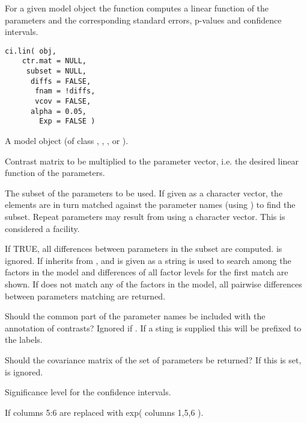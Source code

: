 \begin{Description}\relax
For a given model object the function computes a linear function of
the parameters and the corresponding standard errors, p-values and
confidence intervals.
\end{Description}
\begin{Usage}
\begin{verbatim}
ci.lin( obj,
    ctr.mat = NULL,
     subset = NULL,
      diffs = FALSE,
       fnam = !diffs,
       vcov = FALSE,
      alpha = 0.05,
        Exp = FALSE )
\end{verbatim}
\end{Usage}
\begin{Arguments}
\begin{ldescription}
\item[\code{obj}] A model object (of class , , ,
 or ). 

\item[\code{ctr.mat}] Contrast matrix to be multiplied to the parameter
vector, i.e. the desired linear function of the parameters.
\item[\code{subset}] The subset of the parameters to be used. If given as a
character vector, the elements are in turn matched against the
parameter names (using ) to find the subset. Repeat
parameters may result from using a character vector. This is
considered a facility.
\item[\code{diffs}] If TRUE, all differences between parameters
in the subset are computed.  is ignored. If 
inherits from , and  is given as a string
 is used to search among the factors in the model and
differences of all factor levels for the first match are shown.
If  does not match any of the factors in the model, all
pairwise differences between parameters matching are returned.
\item[\code{fnam}] Should the common part of the parameter names be included
with the annotation of contrasts? Ignored if . If a
sting is supplied this will be prefixed to the labels.
\item[\code{vcov}] Should the covariance matrix of the set of parameters be
returned? If this is set,  is ignored.
\item[\code{alpha}] Significance level for the confidence intervals.
\item[\code{Exp}] If  columns 5:6 are replaced with exp( columns 1,5,6 ).
\end{ldescription}
\end{Arguments}
